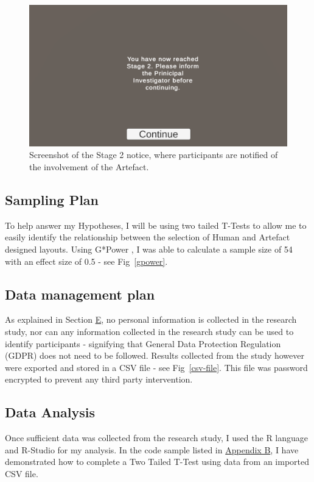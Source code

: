 \begin{figure}[!ht]
    \includegraphics[width=\columnwidth]{./Images/stage-2-notice.png}
    \centering
    \caption{Screenshot of the Stage 2 notice, where participants are notified of the involvement of the Artefact.}
    \label{stage-2}
\end{figure}


\subsection{Sampling Plan}
To help answer my Hypotheses, I will be using two tailed T-Tests to allow me to easily identify the relationship between the selection of Human and Artefact designed layouts.
Using G*Power \cite{gpower}, I was able to calculate a sample size of 54 with an effect size of 0.5 - see Fig~\ref{gpower}.

\subsection{Data management plan}
As explained in Section \hyperref[ethics]{E}, no personal information is collected in the research study, nor can any information collected in the research study can be used to identify participants - signifying that General Data Protection Regulation (GDPR) \cite{gdpr} does not need to be followed. Results collected from the study however were exported and stored in a CSV file - see Fig~\ref{csv-file}. This file was password encrypted to prevent any third party intervention.


\subsection{Data Analysis}
Once sufficient data was collected from the research study, I used the R language and R-Studio for my analysis. In the code sample listed in \hyperref[append:b]{Appendix B}, I have demonstrated how to complete a Two Tailed T-Test using data from an imported CSV file.

